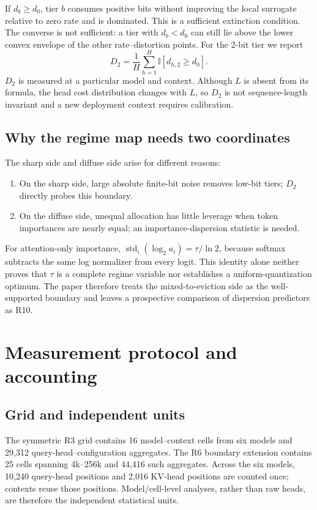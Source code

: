 If $d_b\ge d_0$, tier $b$ consumes positive bits without improving the local
surrogate relative to zero rate and is dominated.  This is a sufficient
extinction condition.  The converse is not sufficient: a tier with $d_b<d_0$
can still lie above the lower convex envelope of the other rate--distortion
points.  For the 2-bit tier we report
\[
 D_2=\frac1H\sum_{h=1}^{H}\mathbb I[d_{h,2}\ge d_0].
\]
$D_2$ is measured at a particular model and context.  Although $L$ is absent
from its formula, the head cost distribution changes with $L$, so $D_2$ is not
sequence-length invariant and a new deployment context requires calibration.

\subsection{Why the regime map needs two coordinates}

The sharp side and diffuse side arise for different reasons:
\begin{enumerate}
 \item On the sharp side, large absolute finite-bit noise removes low-bit tiers;
 $D_2$ directly probes this boundary.
 \item On the diffuse side, unequal allocation has little leverage when token
 importances are nearly equal; an importance-dispersion statistic is needed.
\end{enumerate}
For attention-only importance,
$\operatorname{std}_i(\log_2 a_i)=\tau/\ln2$, because softmax subtracts the same
log normalizer from every logit.  This identity alone neither proves that
$\tau$ is a complete regime variable nor establishes a uniform-quantization
optimum.  The paper therefore treats the mixed-to-eviction side as the
well-supported boundary and leaves a prospective comparison of dispersion
predictors as R10.

\section{Measurement protocol and accounting}
\label{app:protocol}

\subsection{Grid and independent units}

The symmetric R3 grid contains 16 model--context cells from six models and
29,312 query-head--configuration aggregates.  The R6 boundary extension contains
25 cells spanning 4k--256k and 44,416 such aggregates.  Across the six models,
10,240 query-head positions and 2,016 KV-head positions are counted once;
contexts reuse those positions.  Model/cell-level analyses, rather than raw
heads, are therefore the independent statistical units.

